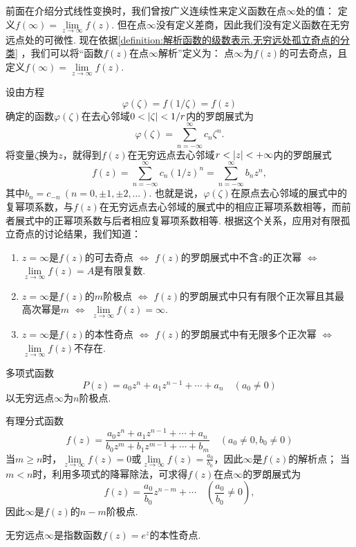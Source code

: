 前面在介绍分式线性变换时，我们曾按广义连续性来定义函数在点\(\infty\)处的值：
定义\(f(\infty) = \lim\limits_{z\to\infty} f(z)\).
但在点\(\infty\)没有定义差商，因此我们没有定义函数在无穷远点处的可微性.
现在依据\cref{definition:解析函数的级数表示.无穷远处孤立奇点的分类} ，我们可以将“函数\(f(z)\)在点\(\infty\)解析”定义为：
点\(\infty\)为\(f(z)\)的可去奇点，且定义\(f(\infty) = \lim\limits_{z\to\infty} f(z)\).

设由方程\[
\varphi(\zeta) = f(1/\zeta) = f(z)
\]确定的函数\(\varphi(\zeta)\)在去心邻域\(0<\abs{\zeta}<1/r\)内的罗朗展式为\[
\varphi(\zeta) = \sum\limits_{n=-\infty}^{\infty} c_n \zeta^n.
\]将变量\(\zeta\)换为\(z\)，就得到\(f(z)\)在无穷远点去心邻域\(r<\abs{z}<+\infty\)内的罗朗展式\[
f(z) = \sum\limits_{n=-\infty}^{\infty} c_n (1/z)^n
= \sum\limits_{n=-\infty}^{\infty} b_n z^n,
\]其中\(b_n = c_{-n}\ (n=0,\pm1,\pm2,\dotsc)\).
也就是说，\(\varphi(\zeta)\)在原点去心邻域的展式中的复幂项系数，与\(f(z)\)在无穷远点去心邻域的展式中的相应正幂项系数相等，而前者展式中的正幂项系数与后者相应复幂项系数相等.
根据这个关系，应用对有限孤立奇点的讨论结果，我们知道：
\begin{enumerate}
\item \(z=\infty\)是\(f(z)\)的可去奇点 \(\iff\) \(f(z)\)的罗朗展式中不含\(z\)的正次幂 \(\iff\) \(\lim\limits_{z\to\infty} f(z) = A\)是有限复数.
\item \(z=\infty\)是\(f(z)\)的\(m\)阶极点 \(\iff\) \(f(z)\)的罗朗展式中只有有限个正次幂且其最高次幂是\(m\) \(\iff\) \(\lim\limits_{z\to\infty} f(z) = \infty\).
\item \(z=\infty\)是\(f(z)\)的本性奇点 \(\iff\) \(f(z)\)的罗朗展式中有无限多个正次幂 \(\iff\) \(\lim\limits_{z\to\infty} f(z)\)不存在.
\end{enumerate}

\begin{example}
多项式函数\[
P(z) = a_0 z^n + a_1 z^{n-1} + \dotsb + a_n
\quad(a_0\neq0)
\]以无穷远点\(\infty\)为\(n\)阶极点.
\end{example}

\begin{example}
有理分式函数\[
f(z) = \frac{a_0 z^n + a_1 z^{n-1} + \dotsb + a_n}{b_0 z^m + b_1 z^{m-1} + \dotsb + b_m}
\quad(a_0\neq0,b_0\neq0)
\]当\(m \geqslant n\)时，\(\lim\limits_{z\to\infty} f(z) = 0\)或\(\lim\limits_{z\to\infty} f(z) = \frac{a_0}{b_0}\)，因此\(\infty\)是\(f(z)\)的解析点；
当\(m<n\)时，利用多项式的降幂除法，可求得\(f(z)\)在点\(\infty\)的罗朗展式为\[
f(z) = \frac{a_0}{b_0} z^{n-m} + \dotsb
\quad(\frac{a_0}{b_0}\neq0),
\]因此\(\infty\)是\(f(z)\)的\(n-m\)阶极点.
\end{example}

\begin{example}
无穷远点\(\infty\)是指数函数\(f(z) = e^z\)的本性奇点.
\end{example}

